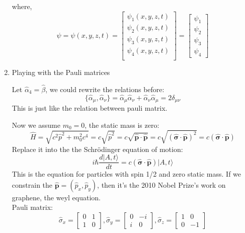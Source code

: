 \documentclass[12pt]{article}
\numberwithin{equation}{section}
\begin{document}
\begin{enumerate}
\begin{equation}
	\end{equation}
	where,
	\[\psi=\psi(x,y,z,t)=\begin{bmatrix}\psi_1(x,y,z,t) \\ \psi_2(x,y,z,t) \\ \psi_3(x,y,z,t) \\ \psi_4(x,y,z,t) \\\end{bmatrix}
	=\begin{bmatrix}\psi_1 \\ \psi_2 \\ \psi_3 \\ \psi_4 \end{bmatrix}\]
\item Playing with the Pauli matrices \par
	Let $\hat{\alpha}_4=\hat{\beta}$, we could rewrite the relations before:
	\begin{equation}
		\{\hat{\alpha}_\mu, \hat{\alpha}_\nu \}=
		\hat{\alpha}_\mu \hat{\alpha}_\nu + \hat{\alpha}_\nu \hat{\alpha}_\mu = 
		2 \delta_{\mu \nu}
	\end{equation}
	This is just like the relation between pauli matrix.\par
	Now we assume $m_0=0$, the static mass is zero:
	\begin{equation}
		\hat{H}=\sqrt{c^2\hat{p}^2+m_0^2c^4}
		=c\sqrt{\hat{p}^2}=c\sqrt{\hat{\mathbf{p}}\cdot\hat{\mathbf{p}}}
		=c\sqrt{(\hat{\bm{\sigma}}\cdot\hat{\mathbf{p}})^2}
		=c(\hat{\bm{\sigma}}\cdot\hat{\mathbf{p}})
	\end{equation}
	Replace it into the the Schr\"{o}dinger equation of motion:
	\begin{equation}
		i\hbar\frac{d|A,t\rangle}{dt}
		=c(\hat{\bm{\sigma}}\cdot\hat{\mathbf{p}})|A,t\rangle
	\end{equation}
	This is the equation for particles with spin 1/2 and zero static mass. If we constrain the $\hat{\mathbf{p}}=(\hat{p}_x,\hat{p}_y)$, then it's the 2010 Nobel Prize's work on graphene, the weyl equation. \\
	Pauli matrix:
	\begin{equation}
		\hat{\sigma}_x=\begin{bmatrix}0&1\\1&0\end{bmatrix},
		\hat{\sigma}_y=\begin{bmatrix}0&-i\\i&0\end{bmatrix},
		\hat{\sigma}_z=\begin{bmatrix}1&0\\0&-1\end{bmatrix}

\end{equation}
\end{enumerate}
\end{document}
